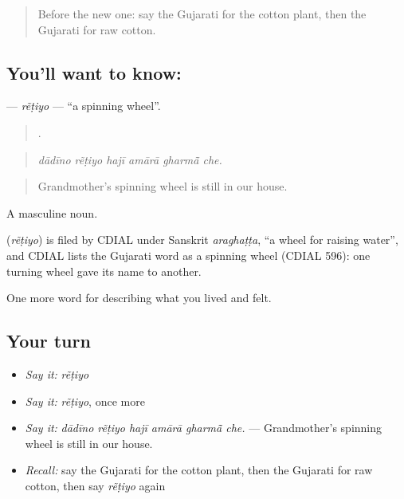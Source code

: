 \label{lesson:GU-C505-retiyo}



\begin{quote}
Before the new one: say the Gujarati for the cotton plant, then the Gujarati for raw cotton.
\end{quote}

\subsection*{You'll want to know: }
\textbf{} — \emph{rẽṭiyo} — \textquotedblleft{}a spinning wheel\textquotedblright{}.

\begin{quote}
     .
\end{quote}

\begin{quote}
\emph{dādīno rẽṭiyo hajī amārā gharmā̃ che.}
\end{quote}

\begin{quote}
Grandmother's spinning wheel is still in our house.
\end{quote}

A masculine noun.

\begin{cousinweb}
\textbf{} (\emph{rẽṭiyo}) is filed by CDIAL under Sanskrit \emph{araghaṭṭa}, \textquotedblleft{}a wheel for raising water\textquotedblright{}, and CDIAL lists the Gujarati word as a spinning wheel (CDIAL 596): one turning wheel gave its name to another.
\end{cousinweb}

\begin{grammarlens}[title={What you've built}]
One more word for describing what you lived and felt.
\end{grammarlens}

\subsection*{Your turn}
\begin{itemize}
\raggedright
  \item \emph{Say it:} \emph{rẽṭiyo}
  \item \emph{Say it:} \emph{rẽṭiyo}, once more
  \item \emph{Say it:} \emph{dādīno rẽṭiyo hajī amārā gharmā̃ che.} — Grandmother's spinning wheel is still in our house.
  \item \emph{Recall:} say the Gujarati for the cotton plant, then the Gujarati for raw cotton, then say \emph{rẽṭiyo} again
\end{itemize}

